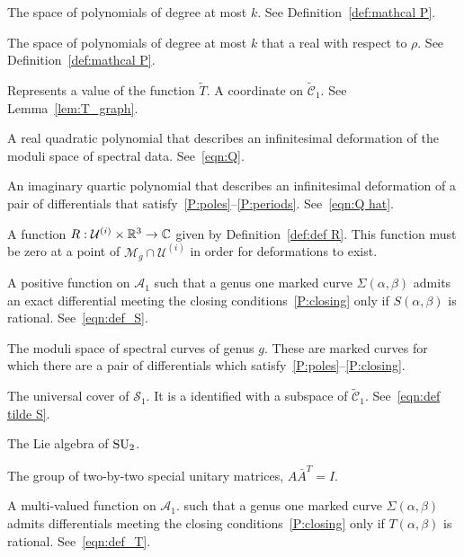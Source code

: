 \begin{description}[align=right]
\item[$\mathcal{P}^k$] The space of polynomials of degree at most $k$. See Definition~\ref{def:mathcal P}.

\item[$\mathcal{P}^k_\R$] The space of polynomials of degree at most $k$ that a real with respect to $ρ$. See Definition~\ref{def:mathcal P}.

\item[$q$] Represents a value of the function $\tilde{T}$. A coordinate on $\mathcal{\tilde{C}}_1$. See Lemma~\ref{lem:T_graph}.

\item[$Q$] A real quadratic polynomial that describes an infinitesimal deformation of the moduli space of spectral data. See~\eqref{eqn:Q}.

\item[$\hat{Q}$] An imaginary quartic polynomial that describes an infinitesimal deformation of a pair of differentials that satisfy~\ref{P:poles}--\ref{P:periods}. See~\eqref{eqn:Q hat}.

\item[$R$] A function $R : \mathcal{U}^{(i)} \times \R^3 \to \C$ given by Definition~\ref{def:def R}. This function must be zero at a point of $\mathcal{M}_g \cap \mathcal{U}^{(i)}$ in order for deformations to exist.

\item[$S$] A positive function on $\mathcal{A}_1$ such that a genus one marked curve $Σ(α,β)$ admits an exact differential meeting the closing conditions~\ref{P:closing} only if $S(α,β)$ is rational. See~\eqref{eqn:def_S}.

\item[$\mathcal{S}_g$] The moduli space of spectral curves of genus $g$. These are marked curves for which there are a pair of differentials which satisfy~\ref{P:poles}--\ref{P:closing}.

\item[$\mathcal{\tilde{S}}_1$] The universal cover of $\mathcal{S}_1$. It is a identified with a subspace of $\mathcal{\tilde{C}}_1$. See~\eqref{eqn:def tilde S}.

\item[$\su_2$] The Lie algebra of $\SU_2$.

\item[$\SU_2$] The group of two-by-two special unitary matrices, $A \bar{A}^T = I$.

\item[$T$] A multi-valued function on $\mathcal{A}_1$. such that a genus one marked curve $Σ(α,β)$ admits differentials meeting the closing conditions~\ref{P:closing} only if $T(α,β)$ is rational. See~\eqref{eqn:def_T}.


\end{description}
